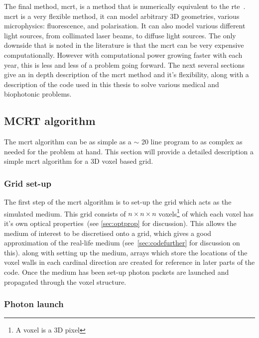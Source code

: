 \medskip

The final method, \gls{mcrt}, is a method that is numerically equivalent to the \gls{rte}~\cite{wang2012biomedical}. \Gls{mcrt} is a very flexible method, it can model arbitrary 3D geometries, various microphysics: fluorescence, and polarisation. It can also model various different light sources, from collimated laser beams, to diffuse light sources. The only downside that is noted in the literature is that the \gls{mcrt} can be very expensive computationally. However with computational power growing faster with each year, this is less and less of a problem going forward. The next several sections give an in depth description of the \gls{mcrt} method and it's flexibility, along with a description of the code used in this thesis to solve various medical and biophotonic problems.

\subsection{MCRT algorithm}

The \gls{mcrt} algorithm can be as simple as a $\sim$ 20 line program to as complex as needed for the problem at hand. This section will provide a detailed description a simple \gls{mcrt} algorithm for a 3D voxel based grid.

\subsubsection{Grid set-up}\label{sec:photsetup}

The first step of the \gls{mcrt} algorithm is to set-up the grid which acts as the simulated medium. This grid consists of $n \times n \times n$ voxels\footnote{A voxel is a 3D pixel} of which each voxel has it's own optical properties~(see \cref{sec:optprop} for discussion). This allows the medium of interest to be discretised onto a grid, which gives a good approximation of the real-life medium (see~\cref{sec:codefurther} for discussion on this). along with setting up the medium, arrays which store the locations of the voxel walls in each cardinal direction are created for reference in later parts of the code. Once the medium has been set-up photon packets are launched and propagated through the voxel structure.


\subsubsection{Photon launch}\label{sec:photlaunch}

